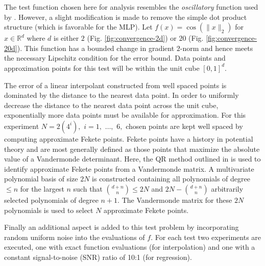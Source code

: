 \documentclass[smallextended,final]{svjour3}  %
\begin{document}
The test function chosen here for analysis resembles the
\textit{oscillatory} function used by \cite{barthelmann2000high}.
However, a slight modification is made to remove the simple dot
product structure (which is favorable for the MLP). Let $f(x)
=\cos(\|x\|_2)$ for $x \in \mathbb{R}^d$ where $d$ is either $2$
(Fig. \ref{fig:convergence-2d}) or $20$
(Fig. \ref{fig:convergence-20d}). This function has a bounded change
in gradient $2$-norm and hence meets the necessary Lipschitz condition
for the error bound. Data points and approximation points for this
test will be within the unit cube $[0,1]^d$.

The error of a linear interpolant constructed from well spaced points
is dominated by the distance to the nearest data point. In order to
uniformly decrease the distance to the nearest data point across the
unit cube, exponentially more data points must be available for
approximation. For this experiment $N = 2(4^i),$ $i = 1,$ $\ldots,$
$6,$ chosen points are kept well spaced by computing approximate
Fekete points. Fekete points have a history in potential theory
\cite{kovari_pommerenke_1968} and are most generally defined as those
points that maximize the absolute value of a Vandermonde
determinant. Here, the QR method outlined in \cite{bos2010computing}
is used to identify approximate Fekete points from a Vandermonde
matrix. A multivariate polynomial basis of size $2N$ is constructed
containing all polynomials of degree $\leq n$ for the largest $n$ such
that ${d+n \choose n} \leq 2N$ and $2N - {d+n \choose n}$
arbitrarily selected polynomials of degree $n + 1.$ The Vandermonde
matrix for these $2N$ polynomials is used to select $N$ approximate
Fekete points.

Finally an additional aspect is added to this test problem by
incorporating random uniform noise into the evaluations of $f.$ For
each test two experiments are executed, one with exact function
evaluations (for interpolation) and one with a constant signal-to-noise
(SNR) ratio of 10:1 (for regression).
\end{document}
